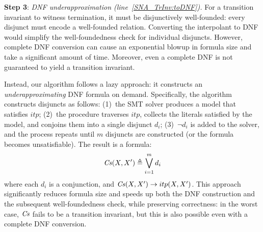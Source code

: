 \textbf{Step 3}: \textit{DNF underapproximation (line~\ref{SNA_TrInv:toDNF}).}
For a transition invariant to witness termination, it must be 
disjunctively well-founded: every disjunct must encode a 
well-founded relation. 
Converting the interpolant to DNF would simplify the well-foundedness
check for individual disjuncts.
However, complete DNF conversion can cause an exponential 
blowup in formula size and take a significant amount of time. 
Moreover, even a complete DNF is not guaranteed to yield a 
transition invariant.

Instead, our algorithm follows a lazy approach: it constructs an 
\emph{underapproximating} DNF formula on demand.
Specifically, the algorithm constructs disjuncts as follows:
(1)~the SMT solver produces a model that satisfies $itp$;
(2)~the procedure traverses $itp$, collects the literals satisfied by
the model, and conjoins them into a single disjunct $d_i$;
(3)~$\lnot d_i$ is added to the solver, and the process repeats
until $m$ disjuncts are constructed (or the formula becomes unsatisfiable).
The result is a formula:
$$\mathit{Cs}(X,X') \triangleq \bigvee_{i=1}^m d_i$$
where each $d_i$ is a conjunction, and $\mathit{Cs}(X,X') \rightarrow itp(X,X')$.
This approach significantly reduces formula size and speeds up both the DNF
construction and the subsequent well-foundedness check, while preserving correctness:
in the worst case, $\mathit{Cs}$ fails to be a transition invariant, but this is also 
possible even with a complete DNF conversion.


